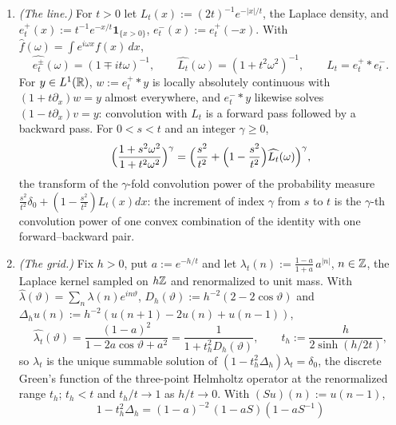 \begin{proposition}
\label{prop:recursion-helmholtz}
\leanok
\begin{enumerate}
\item \emph{(The line.)} For $t > 0$ let $L_t(x) := (2t)^{-1}e^{-|x|/t}$, the Laplace density,
and $e^+_t(x) := t^{-1}e^{-x/t}\mathbf 1_{\{x > 0\}}$, $e^-_t(x) := e^+_t(-x)$. With
$\widehat f(\omega) = \int e^{i\omega x}f(x)\,dx$,
\[
  \widehat{e^\pm_t}(\omega) = (1 \mp it\omega)^{-1}, \qquad
  \widehat{L_t}(\omega) = (1 + t^2\omega^2)^{-1}, \qquad L_t = e^+_t * e^-_t .
\]
For $y \in L^1(\mathbb{R})$, $w := e^+_t * y$ is locally absolutely continuous with
$(1 + t\partial_x)w = y$ almost everywhere, and $e^-_t * y$ likewise solves
$(1 - t\partial_x)v = y$: convolution with $L_t$ is a forward pass followed by a backward pass.
For $0 < s < t$ and an integer $\gamma \ge 0$,
\[
  \Bigl(\frac{1 + s^2\omega^2}{1 + t^2\omega^2}\Bigr)^{\gamma}
   = \Bigl(\frac{s^2}{t^2} + \Bigl(1 - \frac{s^2}{t^2}\Bigr)\widehat{L_t}(\omega)\Bigr)^{\gamma} ,
\]
the transform of the $\gamma$-fold convolution power of the probability measure
$\tfrac{s^2}{t^2}\delta_0 + (1 - \tfrac{s^2}{t^2})L_t(x)dx$: the \Matern{} increment of index
$\gamma$ from $s$ to $t$ is the $\gamma$-th convolution power of one convex combination of the
identity with one forward--backward pair.
\item \emph{(The grid.)} Fix $h > 0$, put $a := e^{-h/t}$ and let
$\lambda_t(n) := \frac{1-a}{1+a}\,a^{|n|}$, $n \in \mathbb{Z}$, the Laplace kernel sampled on $h\mathbb{Z}$ and
renormalized to unit mass. With $\widehat\lambda(\vartheta) = \sum_n\lambda(n)e^{in\vartheta}$,
$D_h(\vartheta) := h^{-2}(2 - 2\cos\vartheta)$ and $\Delta_hu(n) := h^{-2}(u(n+1) - 2u(n) + u(n-1))$,
\[
  \widehat{\lambda_t}(\vartheta) = \frac{(1-a)^2}{1 - 2a\cos\vartheta + a^2}
   = \frac{1}{1 + t_h^2D_h(\vartheta)} ,
  \qquad t_h := \frac{h}{2\sinh(h/2t)} ,
\]
so $\lambda_t$ is the unique summable solution of $(1 - t_h^2\Delta_h)\lambda_t = \delta_0$, the
discrete Green's function of the three-point Helmholtz operator at the renormalized range $t_h$;
$t_h < t$ and $t_h/t \to 1$ as $h/t \to 0$. With $(Su)(n) := u(n-1)$,
\[
  1 - t_h^2\Delta_h = (1-a)^{-2}\,(1 - aS)(1 - aS^{-1})
\]
\end{enumerate}
\end{proposition}
